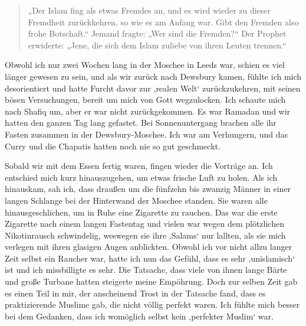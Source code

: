 \documentclass[12pt]{memoir}
\def\–{-\hskip0pt}
\begin{document}
\begin{quote}
„Der Islam fing als etwas Fremdes an,
und es wird wieder zu dieser Fremdheit zurückkehren,
so wie es am Anfang war.
Gibt den Fremden also frohe Botschaft.“
Jemand fragte: „Wer sind die Fremden?“
Der Prophet erwiderte:
„Jene, die sich dem Islam zuliebe von ihren Leuten trennen.“
\end{quote}

Obwohl ich nur zwei Wochen lang in der Moschee in Leeds war,
schien es viel länger gewesen zu sein, und als wir zurück nach Dewsbury kamen,
fühlte ich mich desorientiert und hatte Furcht davor
zur ‚realen Welt‘ zurückzukehren, mit seinen bösen Versuchungen,
bereit um mich von Gott wegzulocken.
Ich schaute mich nach Shafiq um, aber er war nicht zurückgekommen.
Es war Ramadan und wir hatten den ganzen Tag lang gefastet.
Bei Sonnenuntergang brachen alle ihr Fasten zusammen in der Dewsbury\–Moschee.
Ich war am Verhungern, und das Curry
und die Chapatis hatten noch nie so gut geschmeckt.

Sobald wir mit dem Essen fertig waren, fingen wieder die Vorträge an.
Ich entschied mich kurz hinauszugehen, um etwas frische Luft zu holen.
Als ich hinauskam, sah ich, dass draußen um die fünfzehn bis zwanzig Männer
in einer langen Schlange bei der Hinterwand der Moschee standen.
Sie waren alle hinausgeschlichen, um in Ruhe eine Zigarette zu rauchen.
Das war die erste Zigarette nach einem langen Fastentag
und vielen war wegen dem plötzlichen Nikotinrausch schwindelig,
weswegen sie ihre ‚Salams‘ nur lallten,
als sie mich verlegen mit ihren glasigen Augen anblickten.
Obwohl ich vor nicht allzu langer Zeit selbst ein Raucher war,
hatte ich nun das Gefühl, dass es sehr ‚unislamisch‘ ist
und ich missbilligte es sehr.
Die Tatsache, dass viele von ihnen lange Bärte
und große Turbane hatten steigerte meine Empöhrung.
Doch zur selben Zeit gab es einen Teil in mir,
der anscheinend Trost in der Tatsache fand,
dass es praktizierende Muslime gab, die nicht völlig perfekt waren.
Ich fühlte mich besser bei dem Gedanken,
dass ich womöglich selbst kein ‚perfekter Muslim‘ war.
\end{document}
